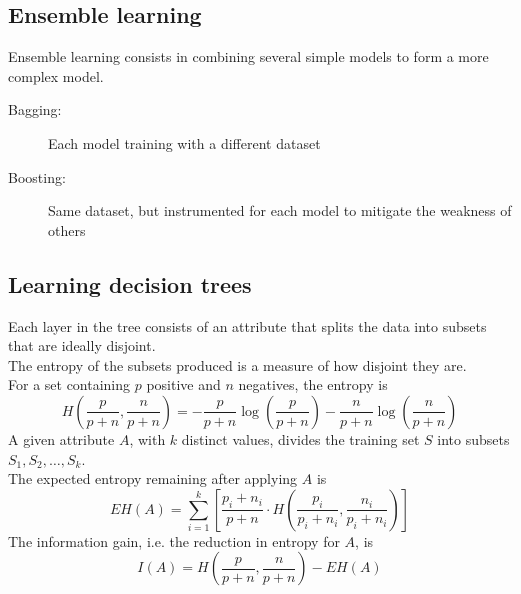 \documentclass[11pt]{article}
\begin{document}
\subsection{Ensemble learning}
\label{sec:org9d88d75}
Ensemble learning consists in combining several simple models to form a more complex
model.
\begin{description}
\item[{Bagging:}] Each model training with a different dataset
\item[{Boosting:}] Same dataset, but instrumented for each model to mitigate the weakness of
others
\end{description}
\subsection{Learning decision trees}
\label{sec:orge30b0c0}
Each layer in the tree consists of an attribute that splits the data into subsets that
are ideally disjoint. \\
The entropy of the subsets produced is a measure of how disjoint they are.
\\[5pt]
For a set containing \(p\) positive and \(n\) negatives, the entropy is
\[
  H\left(\frac{p}{p+n}, \frac{n}{p+n} \right) = - \frac{p}{p + n} \log\left( \frac{p}{p + n} \right) 
                                                - \frac{n}{p + n}\log\left( \frac{n}{p + n} \right)
\]
A given attribute \(A\), with \(k\) distinct values, divides the training set \(S\) into
subsets \(S_1, S_2, \hdots, S_k\). \\
The expected entropy remaining after applying \(A\) is
\[
  EH(A) = \sum_{i = 1}^{k} \left[ \frac{p_i + n_i}{p + n} \cdot H\left( \frac{p_i}{p_i + n_i}, \frac{n_i}{p_i + n_i} \right) \right]
\]
The information gain, i.e. the reduction in entropy for \(A\), is
\[
  I(A) = H\left( \frac{p}{p + n}, \frac{n}{p + n} \right) - EH(A)
\]
\end{document}
